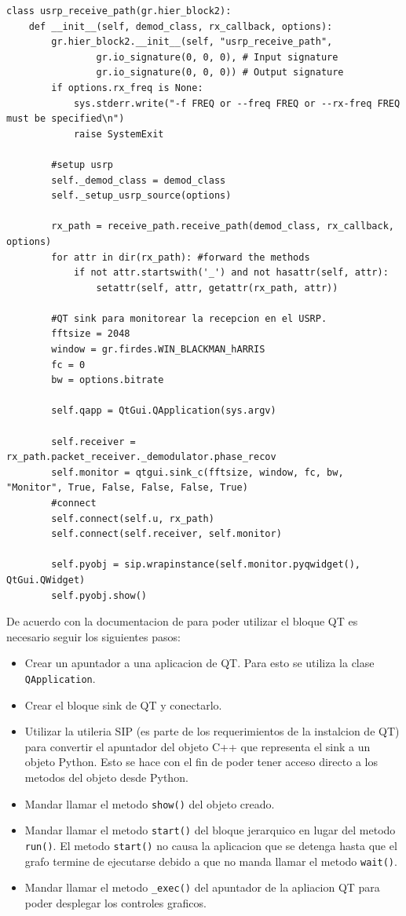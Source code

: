 \begin{lstlisting}[float, label=ex:qtsink, caption={Modificacion del programa \emph{benchmark} para
desplegar el bloque grafico de QT.}, breaklines=true] 
class usrp_receive_path(gr.hier_block2):
    def __init__(self, demod_class, rx_callback, options):
        gr.hier_block2.__init__(self, "usrp_receive_path",
                gr.io_signature(0, 0, 0), # Input signature
                gr.io_signature(0, 0, 0)) # Output signature
        if options.rx_freq is None:
            sys.stderr.write("-f FREQ or --freq FREQ or --rx-freq FREQ must be specified\n")
            raise SystemExit

        #setup usrp
        self._demod_class = demod_class
        self._setup_usrp_source(options)

        rx_path = receive_path.receive_path(demod_class, rx_callback, options)
        for attr in dir(rx_path): #forward the methods
            if not attr.startswith('_') and not hasattr(self, attr):
                setattr(self, attr, getattr(rx_path, attr))

        #QT sink para monitorear la recepcion en el USRP.
        fftsize = 2048
        window = gr.firdes.WIN_BLACKMAN_hARRIS
        fc = 0
        bw = options.bitrate

        self.qapp = QtGui.QApplication(sys.argv)

        self.receiver = rx_path.packet_receiver._demodulator.phase_recov
        self.monitor = qtgui.sink_c(fftsize, window, fc, bw, "Monitor", True, False, False, False, True)
        #connect
        self.connect(self.u, rx_path)
        self.connect(self.receiver, self.monitor)

        self.pyobj = sip.wrapinstance(self.monitor.pyqwidget(), QtGui.QWidget)
        self.pyobj.show()
\end{lstlisting}

De acuerdo con la documentacion de \gnuradio para poder utilizar el bloque QT es necesario seguir
los siguientes pasos:
\begin{itemize}
  \item Crear un apuntador a una aplicacion de QT. Para esto se utiliza la clase
  \verb|QApplication|.
  \item Crear el bloque sink de QT y conectarlo.
  \item Utilizar la utileria SIP (es parte de los requerimientos de la instalcion de QT) para
  convertir el apuntador del objeto C++ que representa el sink a un objeto Python. Esto se hace con
  el fin de poder tener acceso directo a los metodos del objeto desde Python.
  \item Mandar llamar el metodo \verb|show()| del objeto creado.
  \item Mandar llamar el metodo \verb|start()| del bloque jerarquico en lugar del metodo
  \verb|run()|. El metodo \verb|start()| no causa la aplicacion que se detenga hasta que el grafo
  termine de ejecutarse debido a que no manda llamar el metodo \verb|wait()|.
  \item Mandar llamar el metodo \verb|_exec()| del apuntador de la apliacion QT para poder desplegar
  los controles graficos. 
\end{itemize}


